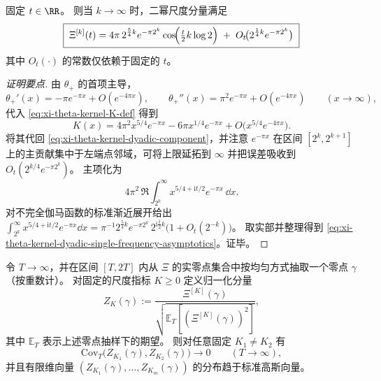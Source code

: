 \begin{theorem}[高尺度分量的单频主导渐近]\label{thm:xi-theta-kernel-dyadic-single-frequency-asymptotics}
固定 \(t\in\RR\)。
则当 \(k\to\infty\) 时，二幂尺度分量满足
\begin{equation}\label{eq:xi-theta-kernel-dyadic-single-frequency-asymptotics}
\boxed{\;
\Xi^{[k]}(t)
=4\pi\,2^{\frac54 k}e^{-\pi 2^k}\cos\!\Bigl(\tfrac{t}{2}k\log 2\Bigr)
\;+\;O_t\!\bigl(2^{\frac14 k}e^{-\pi 2^k}\bigr)\;}
\end{equation}
其中 \(O_t(\cdot)\) 的常数仅依赖于固定的 \(t\)。
\end{theorem}
\begin{proof}[证明要点]
由 \(\theta_+\) 的首项主导，
\[
\theta_+'(x)=-\pi e^{-\pi x}+O(e^{-4\pi x}),
\qquad
\theta_+''(x)=\pi^2 e^{-\pi x}+O(e^{-4\pi x})
\qquad(x\to\infty),
\]
代入 \eqref{eq:xi-theta-kernel-K-def} 得到
\[
K(x)=4\pi^2 x^{5/4}e^{-\pi x}-6\pi x^{1/4}e^{-\pi x}+O\!\bigl(x^{5/4}e^{-4\pi x}\bigr).
\]
将其代回 \eqref{eq:xi-theta-kernel-dyadic-component}，并注意 \(e^{-\pi x}\) 在区间 \([2^k,2^{k+1}]\) 上的主贡献集中于左端点邻域，可将上限延拓到 \(\infty\) 并把误差吸收到 \(O_t(2^{k/4}e^{-\pi 2^k})\)。
主项化为
\[
4\pi^2\,\Re\!\int_{2^k}^{\infty}x^{5/4+\mathrm{i}t/2}e^{-\pi x}\,\dd x.
\]
对不完全伽马函数的标准渐近展开给出
\(
\int_{2^k}^{\infty}x^{5/4+\mathrm{i}t/2}e^{-\pi x}\dd x
=\pi^{-1}2^{\frac54 k}e^{-\pi 2^k}\,2^{\mathrm{i}\frac{t}{2}k}\bigl(1+O_t(2^{-k})\bigr)
\)。
取实部并整理得到 \eqref{eq:xi-theta-kernel-dyadic-single-frequency-asymptotics}。证毕。
\end{proof}

\begin{conjecture}[二幂尺度分量的渐近去相关]\label{conj:xi-theta-kernel-dyadic-asymptotic-decorrelation}
令 \(T\to\infty\)，并在区间 \([T,2T]\) 内从 \(\Xi\) 的实零点集合中按均匀方式抽取一个零点 \(\gamma\)（按重数计）。
对固定的尺度指标 \(K\ge 0\) 定义归一化分量
\[
Z_K(\gamma):=\frac{\Xi^{[K]}(\gamma)}{\sqrt{\mathbb{E}_T[(\Xi^{[K]}(\gamma))^2]}},
\]
其中 \(\mathbb{E}_T\) 表示上述零点抽样下的期望。
则对任意固定 \(K_1\neq K_2\) 有
\[
\mathrm{Cov}_T\!\bigl(Z_{K_1}(\gamma),Z_{K_2}(\gamma)\bigr)\to 0\qquad(T\to\infty),
\]
并且有限维向量 \((Z_{K_1}(\gamma),\dots,Z_{K_m}(\gamma))\) 的分布趋于标准高斯向量。
\end{conjecture}

\endinput
